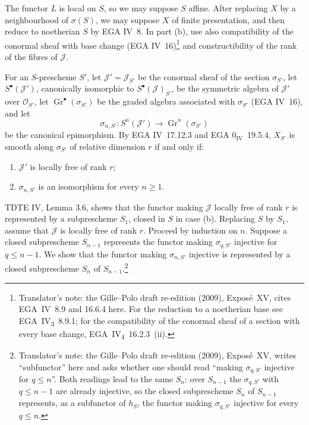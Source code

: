 The functor \(L\) is local on \(S\), so we may suppose \(S\) affine.
After replacing \(X\) by a neighbourhood of \(\sigma(S)\), we may
suppose \(X\) of finite presentation, and then reduce to noetherian
\(S\) by EGA IV~8. In part (b), use also compatibility of the
conormal sheaf with base change (EGA IV~16)\footnote{Translator's note: the Gille--Polo draft re-edition (2009), Exposé~XV, cites EGA~IV~8.9 and 16.6.4 here. For the reduction to a noetherian base see EGA~IV\textsubscript{3}~8.9.1; for the compatibility of the conormal sheaf of a section with every base change, EGA~IV\textsubscript{4}~16.2.3~(ii).} and constructibility
of the rank of the fibres of \(\mathcal J\).

For an \(S\)-prescheme \(S'\), let
\(\mathcal J'=\mathcal J_{S'}\) be the conormal sheaf of the section \(\sigma_{S'}\), let
\(S^\bullet(\mathcal J')\), canonically isomorphic to
\(S^\bullet(\mathcal J)_{S'}\), be the symmetric algebra of
\(\mathcal J'\) over \(\mathcal O_{S'}\), let
\(\operatorname{Gr}^\bullet(\sigma_{S'})\) be the graded algebra
associated with \(\sigma_{S'}\) (EGA IV~16), and let
\[
 \sigma_{n,S'}:S^n(\mathcal J')
 \longrightarrow\operatorname{Gr}^n(\sigma_{S'})
\]
be the canonical epimorphism. By EGA IV~17.12.3 and
EGA \(0_{\mathrm{IV}}\)~19.5.4, \(X_{S'}\) is smooth along
\(\sigma_{S'}\) of relative dimension \(r\) if and only if:
\begin{enumerate}
\renewcommand{\labelenumi}{\textup{\roman{enumi})}}
\item \(\mathcal J'\) is locally free of rank \(r\);
\item \(\sigma_{n,S'}\) is an isomorphism for every \(n\geq1\).
\end{enumerate}

TDTE IV, Lemma 3.6, shows that the functor making \(\mathcal J\)
locally free of rank \(r\) is represented by a subprescheme \(S_1\),
closed in \(S\) in case (b). Replacing \(S\) by \(S_1\), assume that
\(\mathcal J\) is locally free of rank \(r\). Proceed by induction on
\(n\). Suppose a closed subprescheme \(S_{n-1}\) represents the
functor making \(\sigma_{q,S'}\) injective for \(q\leq n-1\).
We show that the functor
making \(\sigma_{n,S'}\) injective is represented by a closed
subprescheme \(S_n\) of \(S_{n-1}\).\footnote{Translator's note: the Gille--Polo draft re-edition (2009), Exposé~XV, writes ``subfunctor'' here and asks whether one should read ``making \(\sigma_{q,S'}\) injective for \(q\leq n\)''. Both readings lead to the same \(S_n\): over \(S_{n-1}\) the \(\sigma_{q,S'}\) with \(q\leq n-1\) are already injective, so the closed subprescheme \(S_n\) of \(S_{n-1}\) represents, as a subfunctor of \(h_S\), the functor making \(\sigma_{q,S'}\) injective for every \(q\leq n\).}

